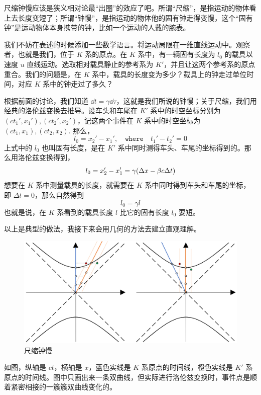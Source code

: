\documentclass[12pt, a4paper, oneside]{ctexbook}
\begin{document}
尺缩钟慢应该是狭义相对论最“出圈”的效应了吧。所谓“尺缩”，是指运动的物体看上去长度变短了；所谓“钟慢”，是指运动的物体他的固有钟走得变慢，这个“固有钟”是运动物体本身携带的钟，比如一个运动的人戴的腕表。

\par 我们不妨在表述的时候添加一些数学语言。将运动局限在一维直线运动中。观察者，也就是我们，位于 $K$ 系的原点。在 $K$ 系中，有一辆固有长度为 $l_{0}$ 的载具以速度 $u$ 直线运动。选取相对载具静止的参考系为 $K'$，并且让这两个参考系的原点重合。我们的问题是，在 $K$ 系中，载具的长度变为多少？载具上的钟走过单位时间，对应 $K$ 系中的钟走过了多久？

\par 根据前面的讨论，我们知道 $\dd{t}=\gamma\dd{\tau}$，这就是我们所说的钟慢；关于尺缩，我们用经典的洛伦兹变换去推导。设车头和车尾在 $K'$ 系中的时空坐标分别为 $(ct_{1}',x_{1}'),(ct_{2}',x_{2}')$，记这两个事件在 $K$ 系中的时空坐标为 $(ct_{1},x_{1}),(ct_{2},x_{2})$. 那么，
\begin{equation}
	l_{0}=x_{2}'-x_{1}',\quad\texttt{where}\quad t_{1}'-t_{2}'=0
\end{equation}
上式中的 $l_{0}$ 也叫固有长度，是在 $K'$ 系中同时测得车头、车尾的坐标得到的。那么用洛伦兹变换得到，
\begin{equation}
	l_{0}=x_{2}'-x_{1}'=\gamma\qty(\Delta x-\beta c\Delta t)
\end{equation}
想要在 $K$ 系中测量载具的长度，就需要在 $K$ 系中同时得到车头和车尾的坐标，即 $\Delta t=0$，那么自然得到
\begin{equation}
	l_{0}=\gamma l
\end{equation}
也就是说，在 $K$ 系看到的载具长度 $l$ 比它的固有长度 $l_{0}$ 要短。

\par 以上是典型的做法，我接下来会用几何的方法去建立直观理解。
\begin{figure}[H]
	\centering
	\includegraphics[scale=0.4]{figures/length-contraction-and-time-dilation.png}
	\caption{尺缩钟慢}
\end{figure}
如图，纵轴是 $ct$，横轴是 $x$，蓝色实线是 $K$ 系原点的时间线，橙色实线是 $K'$ 系原点的时间线。图中只画出来一条双曲线，但实际进行洛伦兹变换时，事件点是顺着紧密相接的一簇簇双曲线变化的。
\end{document}
